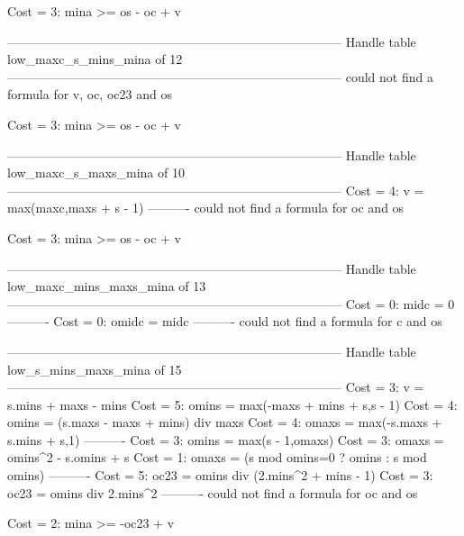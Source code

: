 Cost =  3:  mina >= os - oc + v

--------------------------------------------------------------------------------
Handle table low_maxc_s_mins_mina of 12
--------------------------------------------------------------------------------
could not find a formula for v, oc, oc23 and os

Cost =  3:  mina >= os - oc + v

--------------------------------------------------------------------------------
Handle table low_maxc_s_maxs_mina of 10
--------------------------------------------------------------------------------
Cost =  4:  v  = max(maxc,maxs + s - 1)
----------
could not find a formula for oc and os

Cost =  3:  mina >= os - oc + v

--------------------------------------------------------------------------------
Handle table low_maxc_mins_maxs_mina of 13
--------------------------------------------------------------------------------
Cost =  0:  midc  = 0
----------
Cost =  0:  omidc = midc
----------
could not find a formula for c and os


--------------------------------------------------------------------------------
Handle table low_s_mins_maxs_mina of 15
--------------------------------------------------------------------------------
Cost =  3:  v     = s.mins + maxs - mins
Cost =  5:  omins = max(-maxs + mins + s,s - 1)
Cost =  4:  omins = (s.maxs - maxs + mins) div maxs
Cost =  4:  omaxs = max(-s.maxs + s.mins + s,1)
----------
Cost =  3:  omins = max(s - 1,omaxs)
Cost =  3:  omaxs = omins^2 - s.omins + s
Cost =  1:  omaxs = (s mod omins=0 ? omins : s mod omins)
----------
Cost =  5:  oc23  = omins div (2.mins^2 + mins - 1)
Cost =  3:  oc23  = omins div 2.mins^2
----------
could not find a formula for oc and os

Cost =  2:  mina >= -oc23 + v
